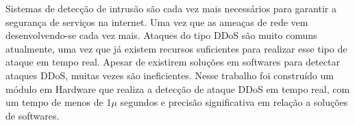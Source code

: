 \setlength{\absparsep}{18pt} %
\begin{resumo}
     
Sistemas de detecção de intrusão são cada vez mais necessários para garantir a segurança de  serviços na internet. Uma vez que as ameaças de rede vem desenvolvendo-se cada vez mais. Ataques do tipo DDoS são muito comuns atualmente, uma vez que já existem recursos suficientes para realizar esse tipo de ataque em tempo real. Apesar de existirem soluções em softwares para detectar ataques DDoS, muitas vezes são ineficientes. Nesse trabalho foi construído um módulo em Hardware que realiza a detecção de ataque DDoS em tempo real, com um tempo de menos de 1$\mu$ segundos e precisão significativa em relação a soluções de softwares.

\end{resumo}